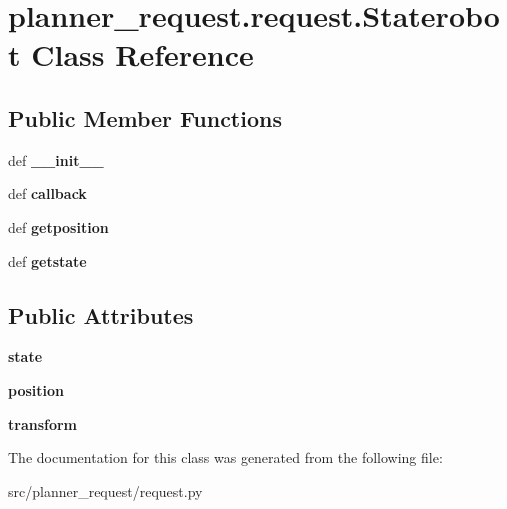 \hypertarget{classplanner__request_1_1request_1_1_staterobot}{\section{planner\-\_\-request.\-request.\-Staterobot \-Class \-Reference}
\label{classplanner__request_1_1request_1_1_staterobot}
}
\subsection*{\-Public \-Member \-Functions}
\begin{DoxyCompactItemize}
\item 
\hypertarget{classplanner__request_1_1request_1_1_staterobot_a91c8a24b7bea917c5d1d3a3a042c80f6}{def {\bfseries \-\_\-\-\_\-init\-\_\-\-\_\-}}\label{classplanner__request_1_1request_1_1_staterobot_a91c8a24b7bea917c5d1d3a3a042c80f6}

\item 
\hypertarget{classplanner__request_1_1request_1_1_staterobot_a68eb43203a11243a21c7aea8bc188dce}{def {\bfseries callback}}\label{classplanner__request_1_1request_1_1_staterobot_a68eb43203a11243a21c7aea8bc188dce}

\item 
\hypertarget{classplanner__request_1_1request_1_1_staterobot_aa56ebc8782946cdedb589a1bc8162e5b}{def {\bfseries getposition}}\label{classplanner__request_1_1request_1_1_staterobot_aa56ebc8782946cdedb589a1bc8162e5b}

\item 
\hypertarget{classplanner__request_1_1request_1_1_staterobot_ab9c2f67912e50973a9edbc6fceeb01db}{def {\bfseries getstate}}\label{classplanner__request_1_1request_1_1_staterobot_ab9c2f67912e50973a9edbc6fceeb01db}

\end{DoxyCompactItemize}
\subsection*{\-Public \-Attributes}
\begin{DoxyCompactItemize}
\item 
\hypertarget{classplanner__request_1_1request_1_1_staterobot_a7e21a8e16d468b2ef726b502c2bc2a83}{{\bfseries state}}\label{classplanner__request_1_1request_1_1_staterobot_a7e21a8e16d468b2ef726b502c2bc2a83}

\item 
\hypertarget{classplanner__request_1_1request_1_1_staterobot_a44c75c09068575ba315acb80ac5e4202}{{\bfseries position}}\label{classplanner__request_1_1request_1_1_staterobot_a44c75c09068575ba315acb80ac5e4202}

\item 
\hypertarget{classplanner__request_1_1request_1_1_staterobot_abfb3a58b8c3cc7300cb55b564e3064c8}{{\bfseries transform}}\label{classplanner__request_1_1request_1_1_staterobot_abfb3a58b8c3cc7300cb55b564e3064c8}

\end{DoxyCompactItemize}


\-The documentation for this class was generated from the following file\-:\begin{DoxyCompactItemize}
\item 
src/planner\-\_\-request/request.\-py\end{DoxyCompactItemize}
